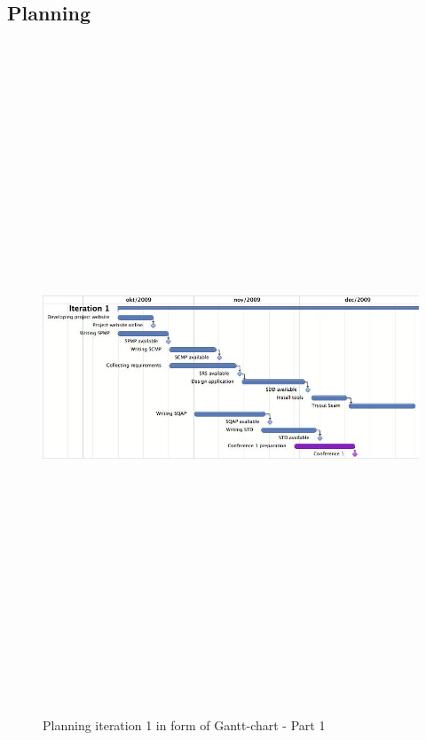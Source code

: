 \documentclass[salesmen, twoside]{../../../templates/latex/2009/softproj}
\begin{document}
\begin{projdoc}
			\section{Planning}	
				\label{planning}
			\begin{figure}
				\begin{center}
				\includegraphics[angle=90, height=20cm]{../../img/gantt-chart-1iter-1.jpg}
				\caption{Planning iteration 1 in form of Gantt-chart - Part 1}
			\end{center}
			\end{figure}
			

\end{projdoc}
\end{document}
